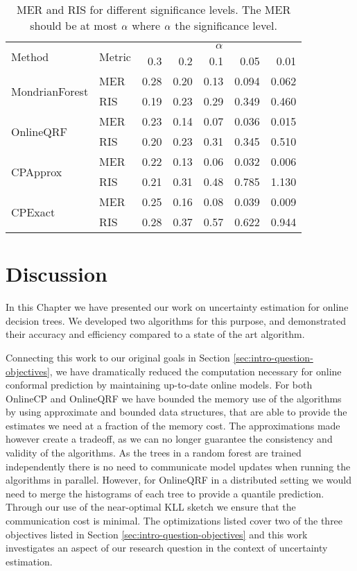 \begin{table}
	\centering
	\begin{tabular}{ll r r r r r}
		\toprule
		\multirow{2}{*}{Method} &  \multirow{2}{*}{Metric} &  \multicolumn{5}{c}{$\alpha$} \\
		\cmidrule(lr){3-7}
		& & 0.3 &   0.2 &   0.1 &   0.05 &   0.01 \\
		\midrule
		\multirow{2}{*}{MondrianForest}   & MER  & 0.28 & 0.20 & 0.13 &  0.094 &  0.062 \\
		& RIS  &  0.19 &  0.23 &  0.29 &   0.349 &   0.460 \\
		\midrule
		\multirow{2}{*}{OnlineQRF} & MER & 0.23 & 0.14 & 0.07 &  0.036 &  0.015 \\
		& RIS &  0.20 &  0.23 &  0.31 &   0.345 &   0.510 \\
		\midrule
		\multirow{2}{*}{CPApprox} & MER  & 0.22 & 0.13 & 0.06 &  0.032 &  0.006 \\
		& RIS &   0.21 &   0.31 &   0.48 &   0.785 &    1.130 \\
		\midrule
		\multirow{2}{*}{CPExact} & MER  & 0.25 & 0.16 & 0.08 &  0.039 &  0.009 \\
		& RIS &   0.28 &   0.37 &   0.57 &   0.622 &   0.944 \\
		\bottomrule
	\end{tabular}
	\caption{MER and RIS for different significance levels. The MER should be at most
		$\alpha$ where $\alpha$ the significance level.}
	\label{tab:uncertain-significance}
\end{table}

\section{Discussion}

In this Chapter we have presented our work on uncertainty estimation for
online decision trees. We developed two algorithms for this purpose,
and demonstrated their accuracy and efficiency compared to a state
of the art algorithm.

Connecting this work to our original goals in Section \ref{sec:intro-question-objectives},
we have dramatically reduced the computation necessary for online conformal
prediction by maintaining up-to-date online models. For both OnlineCP and
OnlineQRF we have bounded the memory use of the algorithms by using approximate
and bounded data structures, that are able to provide the estimates we need
at a fraction of the memory cost.
The approximations made however create a tradeoff,
as we can no longer guarantee the consistency and validity of the algorithms.
As the trees in a random forest are trained independently there is no
need to communicate model updates when running the algorithms in parallel.
However, for OnlineQRF in a distributed setting we would need to merge the histograms of each tree to provide
a quantile prediction. Through our use of the near-optimal KLL sketch we ensure
that the communication cost is minimal.
The optimizations listed cover two of the three objectives
listed in Section \ref{sec:intro-question-objectives} and this work investigates
an aspect of our research question in the context of uncertainty estimation.